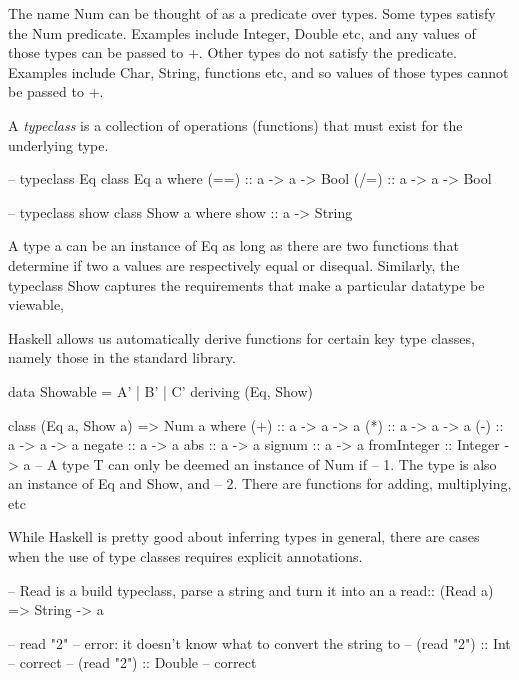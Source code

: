 The name Num can be thought of as a predicate over types. 
Some types satisfy the Num predicate. Examples include Integer, Double etc, and any values of those types can be passed to +. 
Other types do not satisfy the predicate. Examples include Char, String, functions etc, and 
so values of those types cannot be passed to +.

A \textit{typeclass} is a collection of operations (functions) that must exist for the underlying type.

\begin{haskellcode}
-- typeclass Eq
class  Eq a  where
  (==) :: a -> a -> Bool
  (/=) :: a -> a -> Bool

-- typeclass show
class  Show a  where
  show :: a -> String
\end{haskellcode}
A type a can be an instance of Eq as long as there are two functions 
that determine if two a values are respectively equal or disequal. 
Similarly, the typeclass Show captures the requirements that make a particular datatype be viewable,

Haskell allows us automatically derive functions for certain key type classes, namely those in the standard library.
\begin{haskellcode}
data Showable = A' | B' | C' deriving (Eq, Show)

class (Eq a, Show a) => Num a where
    (+) :: a -> a -> a
    (*) :: a -> a -> a
    (-) :: a -> a -> a
    negate :: a -> a
    abs :: a -> a
    signum :: a -> a
    fromInteger :: Integer -> a
-- A type T can only be deemed an instance of Num if
--     1. The type is also an instance of Eq and Show, and
--     2. There are functions for adding, multiplying, etc
\end{haskellcode}

While Haskell is pretty good about inferring types in general, 
there are cases when the use of type classes requires explicit annotations.
\begin{haskellcode}
-- Read is a build typeclass, parse a string and turn it into an a
read:: (Read a) => String -> a

-- read "2" -- error: it doesn’t know what to convert the string to
-- (read "2") :: Int -- correct
-- (read "2") :: Double -- correct
\end{haskellcode}






